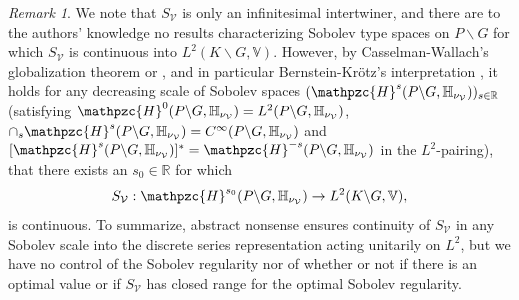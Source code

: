 \documentclass[a4paper,reqno]{amsart}
\numberwithin{equation}{section}
\def\R{\mathbb{R}}
\theoremstyle{definition}
\theoremstyle{remark}
\newtheorem{remark}[thm]{Remark}
\begin{document}
\begin{remark}
\label{globaadad}
We note that $S_{\mathcal{V}}$ is only an infinitesimal intertwiner, and there are to the authors' knowledge no results characterizing Sobolev type spaces on $P\backslash G$ for which $S_{\mathcal{V}}$ is continuous into $L^2(K\backslash G,\mathbb{V})$. However, by Casselman-Wallach's globalization theorem \cite{cassglob,wallachasy} or \cite[Chapter 11]{wallachbookII}, and in particular Bernstein-Krötz's interpretation  \cite[Theorem 1.1]{krobern}, it holds for any decreasing scale of Sobolev spaces $(\mathpzc{H}^s(P\backslash G,\mathbb{H}_{\nu_{\mathcal{V}}}))_{s\in \R}$ (satisfying $\mathpzc{H}^0(P\backslash G,\mathbb{H}_{\nu_{\mathcal{V}}})=L^2(P\backslash G,\mathbb{H}_{\nu_{\mathcal{V}}})$, $\cap_s \mathpzc{H}^s(P\backslash G,\mathbb{H}_{\nu_{\mathcal{V}}})=C^\infty(P\backslash G,\mathbb{H}_{\nu_{\mathcal{V}}})$ and $[\mathpzc{H}^s(P\backslash G,\mathbb{H}_{\nu_{\mathcal{V}}})]^*=\mathpzc{H}^{-s}(P\backslash G,\mathbb{H}_{\nu_{\mathcal{V}}})$ in the $L^2$-pairing), that there exists an $s_0\in \R$ for which 
$$S_{\mathcal{V}}: \mathpzc{H}^{s_0}(P\backslash G,\mathbb{H}_{\nu_{\mathcal{V}}})\to L^2(K\backslash G,\mathbb{V}),$$
is continuous. To summarize, abstract nonsense ensures continuity of $S_{\mathcal{V}}$ in any Sobolev scale into the discrete series representation acting unitarily on $L^2$, but we have no control of the Sobolev regularity nor of whether or not if there is an optimal value or if $S_{\mathcal{V}}$ has closed range for the optimal Sobolev regularity.
\end{remark}
\end{document}
